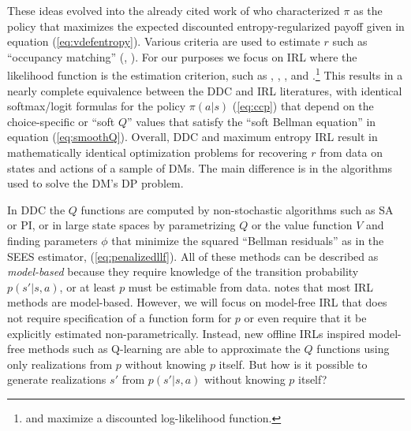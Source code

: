These ideas evolved into the already cited work of \citet{softqlearning:2017} who characterized $\pi$ as the policy that maximizes the
expected discounted entropy-regularized payoff given in equation (\ref{eq:vdefentropy}). 
Various criteria are used to estimate $r$ such as ``occupancy matching'' (\citet{hoermon:2016}, \citet{clare:2023}). For our purposes
we focus on IRL where the likelihood function is the estimation criterion, such as \citet{ermon:2015}, \citet{zeng:2023}, \citet{zeng:2024},
\citet{rp:2022} and \citet{kang:2025}.\footnote{\footnotesize \citet{zeng:2023} and \citet{zeng:2024} maximize a discounted log-likelihood function.} 
This results in a nearly complete equivalence between the DDC and IRL literatures, with
identical softmax/logit formulas for the policy $\pi(a|s)$ (\ref{eq:ccp}) 
that depend on the choice-specific or ``soft $Q$'' values that satisfy the ``soft Bellman equation''
in equation (\ref{eq:smoothQ}). Overall, DDC and maximum entropy IRL result in
mathematically identical optimization problems for recovering $r$ from data on states and actions of a sample of DMs.
The main difference is in the algorithms used to solve the DM's DP problem.

In DDC the $Q$ functions are computed  by non-stochastic algorithms such as SA or PI, or in large state spaces
by parametrizing $Q$ or the value function $V$ and finding parameters $\phi$ that minimize the squared ``Bellman
residuals'' as in the SEES estimator, (\ref{eq:penalizedllf}). All of these methods can be described as {\it model-based\/}
because they require knowledge of the transition probability $p(s'|s,a)$, or at least $p$ must be estimable from
data. \citet{adams:2022} notes that most IRL methods are model-based. However, we will focus on 
model-free IRL that does not require specification of a function form for $p$ or
even require that it be explicitly estimated non-parametrically. Instead, 
new offline IRLs inspired model-free methods such as Q-learning are able to approximate the $Q$ functions 
using only realizations from $p$ without knowing $p$ itself.  
But how is it possible to generate realizations $s'$ from $p(s'|s,a)$ without knowing $p$ itself?

